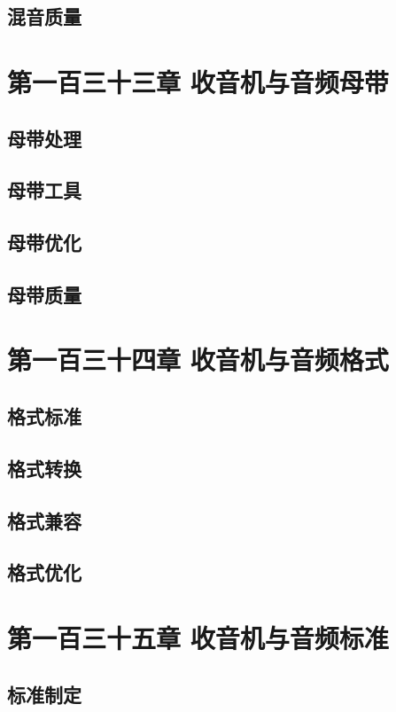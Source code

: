 \documentclass[12pt,UTF8]{ctexbook}
\begin{document}
\section{混音质量}

\chapter{第一百三十三章 收音机与音频母带}

\section{母带处理}
\section{母带工具}
\section{母带优化}
\section{母带质量}

\chapter{第一百三十四章 收音机与音频格式}

\section{格式标准}
\section{格式转换}
\section{格式兼容}
\section{格式优化}

\chapter{第一百三十五章 收音机与音频标准}

\section{标准制定}
\end{document}
